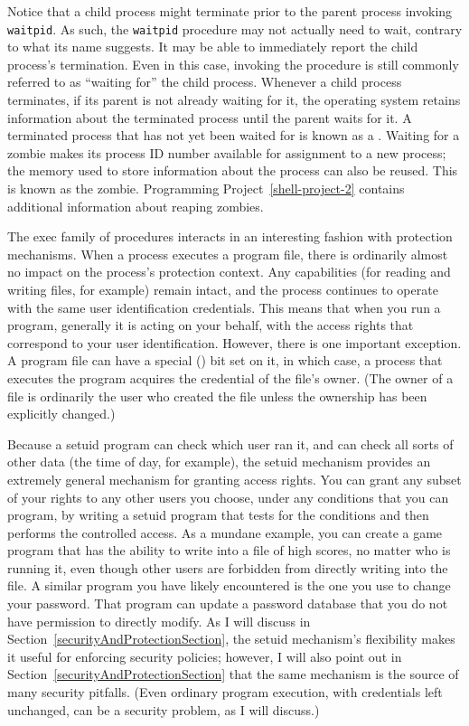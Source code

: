 Notice that a child process might terminate prior to the parent
process invoking \verb|waitpid|.  As such, the \verb|waitpid|
procedure may not actually need to wait, contrary to what its name
suggests.  It may be able to immediately report the child process's
termination.  Even in this case, invoking the procedure is still
commonly referred to as ``waiting for'' the child process.
Whenever a child process
terminates, if its parent is not already waiting for it, the operating
system retains information about the terminated process until the
parent waits for it.  A terminated process that has not yet been waited for is
known as a .  Waiting for a zombie makes its process ID
number available for assignment to a new process; the memory used to
store information about the process can also be reused.  This is known
as  the zombie.  Programming
Project~\ref{shell-project-2} contains additional information about
reaping zombies.

The exec family of procedures interacts in an interesting fashion with
protection mechanisms.  When a process executes a program file, there
is ordinarily almost no impact on the process's protection context.
Any capabilities (for reading and writing files, for example) remain
intact, and the process continues to operate with the same user
identification credentials.  This means that when you run a program,
generally it is acting on your behalf, with the access rights that
correspond to your user identification.  However, there is one
important exception.  A program file can have a special  () bit set on it, in which case, a process
that executes the program acquires the credential of the file's
owner.
(The owner of a file is ordinarily the user who created the file unless the ownership has been explicitly changed.)

Because a setuid program can check which user ran it, and can check
all sorts of other data (the time of day, for example), the
setuid mechanism provides an extremely general mechanism for granting
access rights.  You can grant any subset of your rights to any other
users you choose, under any conditions that you can program, by
writing a setuid program that tests for the conditions and then
performs the controlled access.  As a mundane example, you can create a
game program that has the ability to write into a file of high scores,
no matter who is running it, even though other users are
forbidden from directly writing into the file.  A similar program you have likely
encountered is the one you use to change your password.  That program can update a
password database that you do not have permission to directly modify.  As I will discuss in
Section~\ref{securityAndProtectionSection}, the setuid mechanism's
flexibility makes it useful for enforcing security
policies; however, I will also point out in Section~\ref{securityAndProtectionSection} that the same
mechanism is the source of many security pitfalls.  (Even ordinary
program execution, with credentials left unchanged, can be a
security problem, as I will discuss.)

